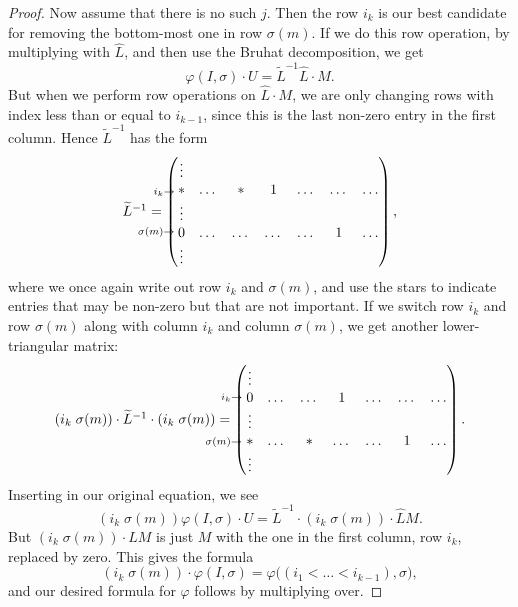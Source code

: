 \begin{proof}
  Now assume that there is no such $j$. Then the row $i_k$ is our best
  candidate for removing the bottom-most one in row $\sigma(m)$. If we
  do this row operation, by multiplying with $\widehat L$, and then
  use the
  Bruhat decomposition, we get
  \[ \varphi(I,\sigma)\cdot U = \widetilde{L}^{-1}\widehat{L} \cdot
  M. \]
  But when we perform row operations on $\widehat{L} \cdot M$, we are
  only changing rows with index less than or equal to $i_{k-1}$, since
  this is the last non-zero entry in the first column. Hence
  $\widetilde{L}^{-1}$
  has the form
  \[ \xy
  (-19,5)*{\scriptstyle i_k\to};
  (-21,-5)*{\scriptstyle \sigma(m)\to};
  (5,0)*{\widetilde{L}^{-1} = 
    \begin{pmatrix}
      \vdots \\
      * & \dots & * & 1 & \dots & \dots & \dots \\
      \vdots \\
      0 & \dots & \dots & \dots & \dots & 1 & \dots \\
      \vdots
    \end{pmatrix},};
  \endxy \]
  where we once again write out row $i_k$ and $\sigma(m)$, and use the
  stars to indicate entries that may be non-zero but that are not
  important.
  If we switch row $i_k$ and row $\sigma(m)$ along with column
  $i_k$ and column $\sigma(m)$, we get another lower-triangular
  matrix:
  \[ \xy
  (-2.1,5.6)*{\scriptstyle i_k\to};
  (-4.1,-5.5)*{\scriptstyle \sigma(m)\to};
  (5,0)*{(i_k \; \sigma(m))\cdot \widetilde{L}^{-1}\cdot (i_k \;
    \sigma(m)) = 
    \begin{pmatrix}
      \vdots \\
      0 & \dots & \dots & 1 & \dots & \dots & \dots \\
      \vdots \\
      * & \dots & * & \dots & \dots & 1 & \dots \\
      \vdots
    \end{pmatrix}.}
  \endxy\]
  Inserting in our original equation, we see
  \[ (i_k \; \sigma(m)) \varphi(I,\sigma) \cdot U = \widetilde{L}^{-1}
  \cdot (i_k \; \sigma(m)) \cdot \widehat{L} M. \]
  But $(i_k \; \sigma(m)) \cdot \widehat{L} M$ is just $M$ with the
  one in the first column, row $i_k$, replaced by zero. This gives the
  formula
  \[ (i_k \; \sigma(m)) \cdot \varphi(I,\sigma) =
  \varphi\big((i_1<\dots<i_{k-1}),\sigma\big), \]
  and our desired formula for $\varphi$ follows by multiplying over.
\end{proof}

